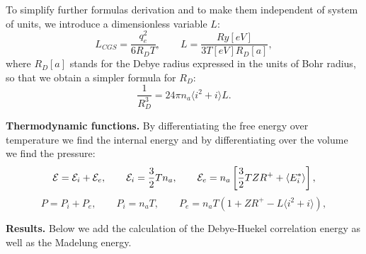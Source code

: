 To simplify further formulas derivation and to make them independent of system of units,
we introduce a dimensionless variable $L$:
\begin{equation}
L_{CGS} = \frac{q_e^2}{6 R_D T},\qquad
L = \frac{Ry[eV]}{3 T[eV] R_D[a]},
\end{equation}
where $R_D[a]$ stands for the Debye radius expressed in the units of Bohr radius,
so that we obtain a simpler formula for $R_D$:
\begin{equation}
\frac{1}{R_D^3} = 24 \pi n_a \langle i^2+i \rangle L.
\end{equation}

{\bf Thermodynamic functions.}
By differentiating the free energy over temperature we find the internal energy and by differentiating over the volume we find the pressure:
\begin{equation}\label{EDH}
{\cal E}={\cal E}_i + {\cal E}_e, \qquad
{\cal E}_i = \frac32 Tn_a, \qquad
{\cal E}_e = n_a \left[ \frac32 TZR^+ + \langle E^*_i\rangle \right],
\end{equation}
\begin{equation}\label{PDH}
P = P_i+P_e, \qquad
P_i = n_a T, \qquad
P_e = n_a T (1 + ZR^+ - L \langle i^2+i \rangle),
\end{equation}

{\bf Results.}
Below we add the calculation of the Debye-Huekel correlation energy as well as the Madelung energy.
\begin{center}
 
\par\end{center}


